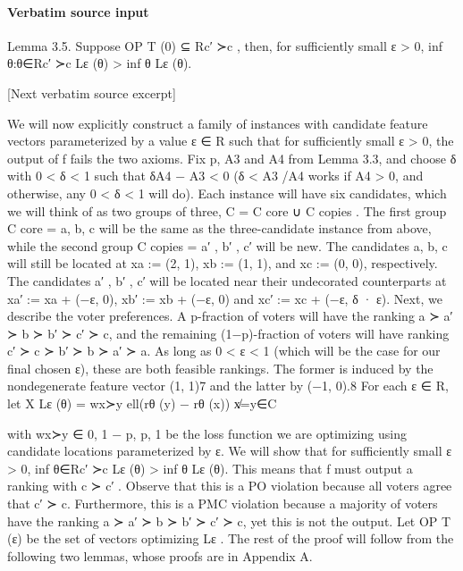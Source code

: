 \documentclass[10pt]{article}
\begin{document}
\paragraph{Verbatim source input}
\begin{ReviewVerbatim}
Lemma 3.5. Suppose OP T (0) ⊆ Rc′ ≻c , then, for sufficiently small ε > 0, inf θ:θ∈Rc′ ≻c Lε (θ) >
inf θ Lε (θ).

[Next verbatim source excerpt]

We will now explicitly construct a family of instances with candidate feature vectors parameterized
by a value ε ∈ R such that for sufficiently small ε > 0, the output of f fails the two axioms. Fix
p, A3 and A4 from Lemma 3.3, and choose δ with 0 < δ < 1 such that δA4 − A3 < 0 (δ < A3 /A4
works if A4 > 0, and otherwise, any 0 < δ < 1 will do).
Each instance will have six candidates, which we will think of as two groups of three, C = C core ∪
C copies . The first group C core = {a, b, c} will be the same as the three-candidate instance from
above, while the second group C copies = {a′ , b′ , c′ } will be new. The candidates a, b, c will still be
located at xa := (2, 1), xb := (1, 1), and xc := (0, 0), respectively. The candidates a′ , b′ , c′ will
be located near their undecorated counterparts at xa′ := xa + (−ε, 0), xb′ := xb + (−ε, 0) and
xc′ := xc + (−ε, δ · ε).
Next, we describe the voter preferences. A p-fraction of voters will have the ranking a ≻ a′ ≻ b ≻
b′ ≻ c′ ≻ c, and the remaining (1−p)-fraction of voters will have ranking c′ ≻ c ≻ b′ ≻ b ≻ a′ ≻ a.
As long as 0 < ε < 1 (which will be the case for our final chosen ε), these are both feasible rankings.
The former is induced by the nondegenerate feature vector (1, 1)7 and the latter by (−1, 0).8
For each ε ∈ R, let                                 X
                                      Lε (θ) =             wx≻y ell(rθ (y) − rθ (x))
                                                  x̸=y∈C

with wx≻y ∈ {0, 1 − p, p, 1} be the loss function we are optimizing using candidate locations
parameterized by ε.
We will show that for sufficiently small ε > 0, inf θ∈Rc′ ≻c Lε (θ) > inf θ Lε (θ). This means that
f must output a ranking with c ≻ c′ . Observe that this is a PO violation because all voters agree
that c′ ≻ c. Furthermore, this is a PMC violation because a majority of voters have the ranking
a ≻ a′ ≻ b ≻ b′ ≻ c′ ≻ c, yet this is not the output.
Let OP T (ε) be the set of vectors optimizing Lε . The rest of the proof will follow from the following
two lemmas, whose proofs are in Appendix A.


\end{ReviewVerbatim}
\end{document}
